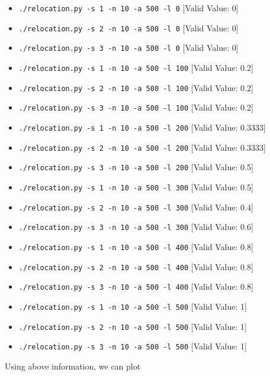 \documentclass[12pt]{article}
\begin{document}
\begin{enumerate}[1.]
    \begin{itemize}
        \item \texttt{./relocation.py -s 1 -n 10 -a 500 -l 0} [Valid Value: 0]
        \item \texttt{./relocation.py -s 2 -n 10 -a 500 -l 0} [Valid Value: 0]
        \item \texttt{./relocation.py -s 3 -n 10 -a 500 -l 0} [Valid Value: 0]
        \item \texttt{./relocation.py -s 1 -n 10 -a 500 -l 100} [Valid Value: 0.2]
        \item \texttt{./relocation.py -s 2 -n 10 -a 500 -l 100} [Valid Value: 0.2]
        \item \texttt{./relocation.py -s 3 -n 10 -a 500 -l 100} [Valid Value: 0.2]
        \item \texttt{./relocation.py -s 1 -n 10 -a 500 -l 200} [Valid Value: 0.3333]
        \item \texttt{./relocation.py -s 2 -n 10 -a 500 -l 200} [Valid Value: 0.3333]
        \item \texttt{./relocation.py -s 3 -n 10 -a 500 -l 200} [Valid Value: 0.5]
        \item \texttt{./relocation.py -s 1 -n 10 -a 500 -l 300} [Valid Value: 0.5]
        \item \texttt{./relocation.py -s 2 -n 10 -a 500 -l 300} [Valid Value: 0.4]
        \item \texttt{./relocation.py -s 3 -n 10 -a 500 -l 300} [Valid Value: 0.6]
        \item \texttt{./relocation.py -s 1 -n 10 -a 500 -l 400} [Valid Value: 0.8]
        \item \texttt{./relocation.py -s 2 -n 10 -a 500 -l 400} [Valid Value: 0.8]
        \item \texttt{./relocation.py -s 3 -n 10 -a 500 -l 400} [Valid Value: 0.8]
        \item \texttt{./relocation.py -s 1 -n 10 -a 500 -l 500} [Valid Value: 1]
        \item \texttt{./relocation.py -s 2 -n 10 -a 500 -l 500} [Valid Value: 1]
        \item \texttt{./relocation.py -s 3 -n 10 -a 500 -l 500} [Valid Value: 1]
    \end{itemize}

    \bigskip

    Using above information, we can plot


\end{enumerate}
\end{document}
